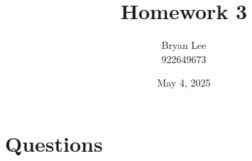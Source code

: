 \documentclass[11pt]{article}
\title{Homework 3}
\author{Bryan Lee\\922649673}
\date{May 4, 2025}
\begin{document}
\maketitle
\thispagestyle{fancy}

\section*{Questions}

\newcommand{\answerOne}{\textbf{
    \begin{enumerate}
        \item Forwarding: The router-local action of transferring a packet from an input link interface to the appropriate output link interface. 
        It typically takes place at very short timescales (typically a few nanoseconds), and is often implemented in hardware.
        \item Routing: The network-wide process that determines the end-to-end paths that packets take from source to destination.
        It typically takes place on much longer timescales (typically seconds), and is often implemented in software.
    \end{enumerate}
    Aside from differences in scale, timescale, and implementation, 
    the key distinction between the two functions is that routing determines the path a packet should take through the network, 
    while forwarding carries out that path by directing the packet to its next hop at each router.
}}
\end{document}
